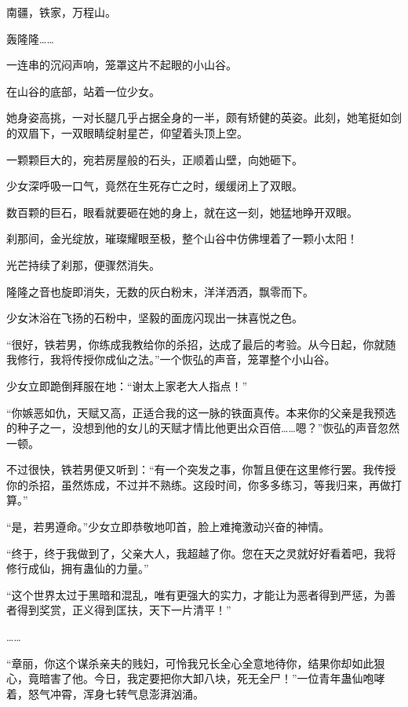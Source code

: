 
\begin{this_body}



南疆，铁家，万程山。

轰隆隆……

一连串的沉闷声响，笼罩这片不起眼的小山谷。

在山谷的底部，站着一位少女。

她身姿高挑，一对长腿几乎占据全身的一半，颇有矫健的英姿。此刻，她笔挺如剑的双眉下，一双眼睛绽射星芒，仰望着头顶上空。

一颗颗巨大的，宛若房屋般的石头，正顺着山壁，向她砸下。

少女深呼吸一口气，竟然在生死存亡之时，缓缓闭上了双眼。

数百颗的巨石，眼看就要砸在她的身上，就在这一刻，她猛地睁开双眼。

刹那间，金光绽放，璀璨耀眼至极，整个山谷中仿佛埋着了一颗小太阳！

光芒持续了刹那，便骤然消失。

隆隆之音也旋即消失，无数的灰白粉末，洋洋洒洒，飘零而下。

少女沐浴在飞扬的石粉中，坚毅的面庞闪现出一抹喜悦之色。

“很好，铁若男，你练成我教给你的杀招，达成了最后的考验。从今日起，你就随我修行，我将传授你成仙之法。”一个恢弘的声音，笼罩整个小山谷。

少女立即跪倒拜服在地：“谢太上家老大人指点！”

“你嫉恶如仇，天赋又高，正适合我的这一脉的铁面真传。本来你的父亲是我预选的种子之一，没想到他的女儿的天赋才情比他更出众百倍……嗯？”恢弘的声音忽然一顿。

不过很快，铁若男便又听到：“有一个突发之事，你暂且便在这里修行罢。我传授你的杀招，虽然炼成，不过并不熟练。这段时间，你多多练习，等我归来，再做打算。”

“是，若男遵命。”少女立即恭敬地叩首，脸上难掩激动兴奋的神情。

“终于，终于我做到了，父亲大人，我超越了你。您在天之灵就好好看着吧，我将修行成仙，拥有蛊仙的力量。”

“这个世界太过于黑暗和混乱，唯有更强大的实力，才能让为恶者得到严惩，为善者得到奖赏，正义得到匡扶，天下一片清平！”

……

“章丽，你这个谋杀亲夫的贱妇，可怜我兄长全心全意地待你，结果你却如此狠心，竟暗害了他。今日，我定要把你大卸八块，死无全尸！”一位青年蛊仙咆哮着，怒气冲霄，浑身七转气息澎湃汹涌。


\end{this_body}
